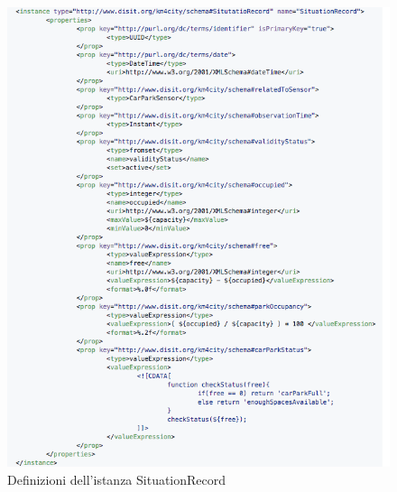 \documentclass[12pt,a4paper,italian]{article}
\begin{document}
\begin{figure}[h!]
	\centering
	\includegraphics[width=14cm]{img/esempio_p3.png}
	\caption{Definizioni dell'istanza SituationRecord}\label{esempio3}
\end{figure}
\end{document}
